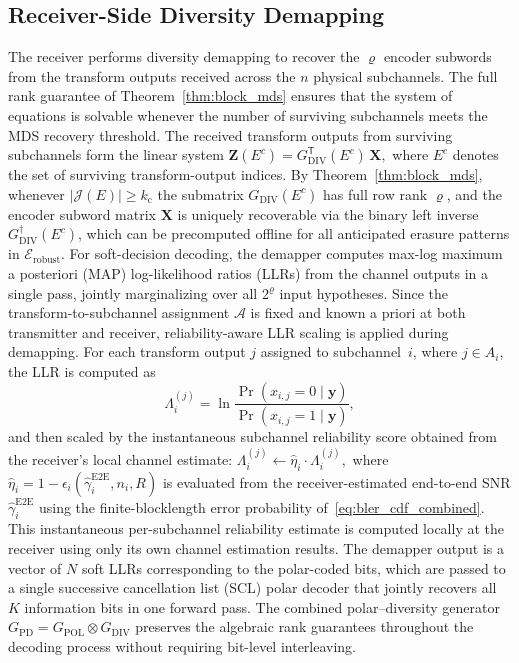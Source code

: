 \documentclass[lettersize,journal]{IEEEtran}
\begin{document}
\subsection{Receiver-Side Diversity Demapping}
\label{subsec:receiver_demapping}
The receiver performs diversity demapping to recover the $\varrho$ encoder subwords from the transform outputs received across the $n$ physical subchannels. The full rank guarantee of Theorem~\ref{thm:block_mds} ensures that the system of equations is solvable whenever the number of surviving subchannels meets the MDS recovery threshold. The received transform outputs from surviving subchannels form the linear system $
\mathbf{Z}(E^c) = G_{\mathrm{DIV}}^{\mathsf{T}}(E^c)\,\mathbf{X},
$ where $E^c$ denotes the set of surviving transform-output indices. By Theorem~\ref{thm:block_mds}, whenever $|\mathcal{J}(E)| \geq k_{\mathrm{c}}$ the submatrix $G_{\mathrm{DIV}}(E^c)$ has full row rank $\varrho$, and the encoder subword matrix $\mathbf{X}$ is uniquely recoverable via the binary left inverse $G_{\mathrm{DIV}}^{\dagger}(E^c)$, which can be precomputed offline for all anticipated erasure patterns in $\mathcal{E}_{\mathrm{robust}}$. For soft-decision decoding, the demapper computes max-log maximum a posteriori (MAP) log-likelihood ratios (LLRs) from the channel outputs in a single pass, jointly marginalizing over all $2^{\varrho}$ input hypotheses. Since the transform-to-subchannel assignment $\mathcal{A}$ is fixed and known a priori at both transmitter and receiver, reliability-aware LLR scaling is applied during demapping. For each transform output $j$ assigned to subchannel~$i$, where $j \in A_i$, the LLR is computed as \begin{equation}
    \Lambda_i^{(j)} = \ln \frac{\Pr(x_{i,j}=0 \mid \mathbf{y})}{\Pr(x_{i,j}=1 \mid \mathbf{y})},
\end{equation}
and then scaled by the instantaneous subchannel reliability score obtained from the receiver's local channel estimate: $
\Lambda_i^{(j)} \leftarrow \hat{\eta}_i \cdot \Lambda_i^{(j)},$
where $\hat{\eta}_i = 1 - \epsilon_i(\hat{\gamma}_i^{\mathrm{E2E}}, n_i, R)$ is evaluated from the receiver-estimated end-to-end SNR $\hat{\gamma}_i^{\mathrm{E2E}}$ using the finite-blocklength error probability of~\eqref{eq:bler_cdf_combined}. This instantaneous per-subchannel reliability estimate is computed locally at the receiver using only its own channel estimation results. The demapper output is a vector of $N$ soft LLRs corresponding to the polar-coded bits, which are passed to a single successive cancellation list (SCL) polar decoder that jointly recovers all $K$ information bits in one forward pass. The combined polar–diversity generator $G_{\mathrm{PD}} = G_{\mathrm{POL}} \otimes G_{\mathrm{DIV}}$  preserves the algebraic rank guarantees throughout the decoding process without requiring bit-level interleaving.
\end{document}
